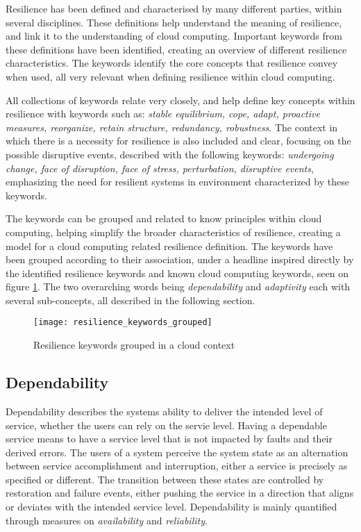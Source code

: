 Resilience has been defined and characterised by many different parties, within several disciplines.\cite{folke2002resilience, dalziell2004resilience, rose2005modeling, andersson2006urban, fiksel2003designing, bruneau2003framework, reed2009methodology, pavard2006design}
These definitions help understand the meaning of resilience, and link it to the understanding of cloud computing. Important keywords from these definitions have been identified, creating an overview of different resilience characteristics. The keywords identify the core concepts that resilience convey when used, all very relevant when defining resilience within cloud computing.

All collections of keywords relate very closely, and help define key concepts within resilience with keywords such as: \textit{stable equilibrium, cope, adapt, proactive measures, reorganize, retain structure, redundancy, robustness}. The context in which there is a necessity for resilience is also included and clear, focusing on the possible disruptive events, described with the following keywords: \textit{undergoing change, face of disruption, face of stress, perturbation, disruptive events}, emphasizing the need for resilient systems in environment characterized by these keywords.

The keywords can be grouped and related to know principles within cloud computing, helping simplify the broader characteristics of resilience, creating a model for a cloud computing related resilience definition. The keywords have been grouped according to their association, under a headline inspired directly by the identified resilience keywords and known cloud computing keywords, seen on figure \ref{fig:resilience_keywords_grouped}. The two overarching words being \textit{dependability} and \textit{adaptivity} each with several sub-concepts, all described in the following section.

\begin{figure}[!htb]
  \texttt{[image: resilience\_keywords\_grouped]}  
  \caption{Resilience keywords grouped in a cloud context}
  \label{fig:resilience_keywords_grouped}
\end{figure}
\newpage
\subsection{Dependability}
Dependability describes the systems ability to deliver the intended level of service, whether the users can rely on the servie level. Having a dependable service means to have a service level that is not impacted by faults and their derived errors. The users of a system perceive the system state as an alternation between service accomplishment and interruption, either a service is precisely as specified or different. The transition between these states are controlled by restoration and failure events, either pushing the service in a direction that aligns or deviates with the intended service level. Dependability is mainly quantified through measures on \textit{availability} and \textit{reliability}\cite{laprie1985dependable}.


